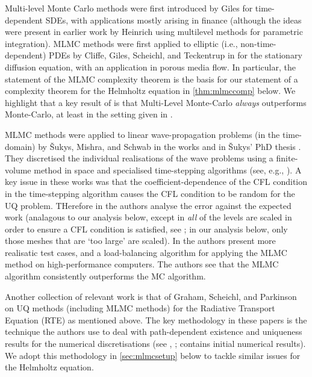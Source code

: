 Multi-level Monte Carlo methods were first introduced by Giles \cite{Gi:08} for time-dependent SDEs, with applications mostly arising in finance (although the ideas were present in earlier work by Heinrich \cite{He:98,He:01} using multilevel methods for parametric integration). MLMC methods were first applied to elliptic (i.e., non-time-dependent) PDEs by Cliffe, Giles, Scheichl, and Teckentrup in \cite{ClGiScTe:11} for the stationary diffusion equation, with an application in porous media flow. In particular, the statement of the MLMC complexity theorem \cite[Theorem 1]{ClGiScTe:11} is the basis for our statement of a complexity theorem for the Helmholtz equation in \cref{thm:mlmccomp} below. We highlight that a key result of \cite[Theorem 1]{ClGiScTe:11} is that Multi-Level Monte-Carlo \emph{always} outperforms Monte-Carlo, at least in the setting given in \cite{ClGiScTe:11}.

MLMC methods were applied to linear wave-propagation problems (in the time-domain) by \v{S}ukys, Mishra, and Schwab in the works \cite{SuMiSc:13,MiScSu:16} and in \v{S}ukys' PhD thesis \cite{Su:14}. They discretised the individual realisations of the wave problems using a finite-volume method in space and specialised time-stepping algorithms (see, e.g., \cite[Section 3.1]{MiScSu:16}). A key issue in these works was that the coefficient-dependence of the CFL condition in the time-stepping algorithm causes the CFL condition to be random for the UQ problem. THerefore in \cite{SuMiSc:13} the authors analyse the error against the expected work (analagous to our analysis below, except in \cite{SuMiSc:13} \emph{all} of the levels are scaled in order to ensure a CFL condition is satisfied, see \cite[Text following Theorem 5]{SuMiSc:13}; in our analysis below, only those meshes that are `too large' are scaled). In \cite{MiScSu:16} the authors present more realisatic test cases, and a load-balancing algorithm for applying the MLMC method on high-performance computers. The authors see that the MLMC algorithm consistently outperforms the MC algorithm.

Another collection of relevant work is that of Graham, Scheichl, and Parkinson \cite{GrPaSc:18,Pa:18,GrPaSc:19} on UQ methods (including MLMC methods) for the Radiative Transport Equation (RTE) as mentioned above. The key methodology in these papers is the technique the authors use to deal with path-dependent existence and uniqueness results for the numerical discretisations (see \cite[Chapter 4]{Pa:18}, \cite[Definition 5.5 ff.]{GrPaSc:19}; \cite{GrPaSc:18} contains initial numerical results). We adopt this methodology in \cref{sec:mlmcsetup} below to tackle similar issues for the Helmholtz equation.

